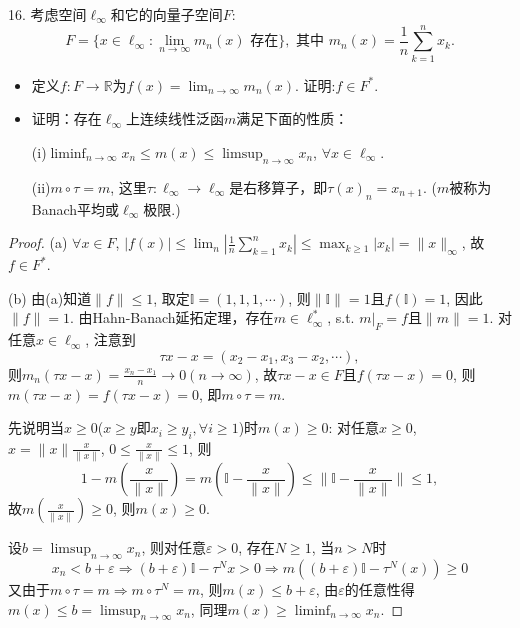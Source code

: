 \documentclass[a4paper,8pt]{ctexart}\textwidth 140mm \textheight 216mm
\newcommand{\e}{\varepsilon}
\newcommand{\8}{\infty}
\newcommand{\RA}{\Rightarrow}
\begin{document}
16. 考虑空间$\ell_{\infty}$和它的向量子空间$F$:
\[F=\{x\in\ell_{\infty}:\lim_{n\to\infty}m_n(x)\text{ 存在}\}, \text{ 其中 }m_n(x)=\frac{1}{n}\sum_{k=1}^n x_k.\]
\begin{itemize}
	\item[(a)] 定义$f:F\to\mathbb{R}$为$f(x)=\lim_{n\to\infty}m_n(x)$. 证明:$f\in F^*$.
	\item[(b)] 证明：存在$\ell_{\infty}$上连续线性泛函$m$满足下面的性质：
	
	(i)$\liminf_{n\to\infty}x_n\leq m(x)\leq \limsup_{n\to\infty} x_n$, $\forall x\in \ell_{\infty}$.
	
	(ii)$m\circ \tau=m$, 这里$\tau:\ell_{\infty}\to\ell_{\infty}$是右移算子，即$\tau(x)_{n}=x_{n+1}$. ($m$被称为Banach平均或$\ell_{\infty}$极限.)
\end{itemize}
\begin{proof}
	(a) $\forall x\in F$, $|f(x)|\leq \lim_{n}|\frac{1}{n}\sum_{k=1}^nx_k|\leq \max_{k\geq 1}|x_k|=\|x\|_{\infty}$, 故$f\in F^*$.
	
	(b) 由(a)知道$\|f\|\leq 1$, 取定$\mathbb{I}=(1,1,1,\cdots)$, 则$\|\mathbb{I}\|=1$且$f(\mathbb{I})=1$, 因此$\|f\|=1$. 由Hahn-Banach延拓定理，存在$m\in \ell_{\infty}^*$, s.t. $m|_{F}=f$且$\|m\|=1$. 对任意$x\in \ell_{\infty}$, 注意到
	\[\tau x-x=(x_2-x_1,x_3-x_2,\cdots),\]
	则$m_n(\tau x-x)=\frac{x_n-x_1}{n}\to 0(n\to\infty)$, 故$\tau x-x\in F$且$f(\tau x-x)=0$, 则$m(\tau x-x)=f(\tau x-x)=0$, 即$m\circ \tau=m$.
	
	先说明当$x\geq 0$($x\geq y$即$x_i\geq y_i,\forall i\geq 1$)时$m(x)\geq 0$: 对任意$x\geq 0$, $x=\|x\|\frac{x}{\|x\|}$, $0\leq \frac{x}{\|x\|}\leq 1$, 则
	\[1-m(\frac{x}{\|x\|})=m(\mathbb{I}-\frac{x}{\|x\|})\leq \|\mathbb{I}-\frac{x}{\|x\|}\|\leq 1,\]
	故$m(\frac{x}{\|x\|})\geq 0$, 则$m(x)\geq 0$.
	
	设$b=\limsup_{n\to\infty} x_n$, 则对任意$\e>0$, 存在$N\geq 1$, 当$n>N$时
	\[x_n<b+\e\Rightarrow(b+\e)\mathbb{I}-\tau^{N}x>0\RA m((b+\e)\mathbb{I}-\tau^{N}(x))\geq 0\]
	又由于$m\circ \tau=m\RA m\circ \tau^N=m$, 则$m(x)\leq b+\e$, 由$\e$的任意性得$m(x)\leq b=\limsup_{n\to\infty}x_n$, 同理$m(x)\geq \liminf_{n\to\infty}x_n$.
\end{proof}
\end{document}
